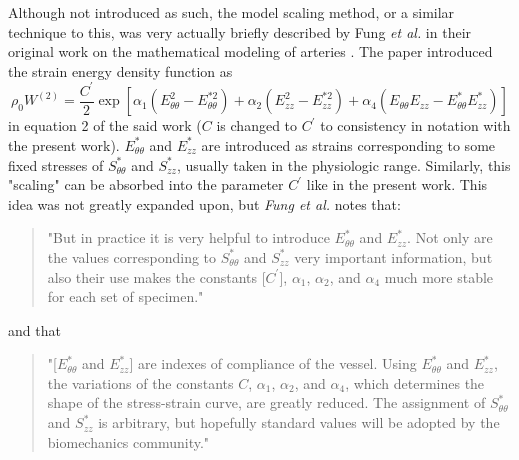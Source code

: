     Although not introduced as such, the model scaling method, or a similar technique to this, was very actually briefly described by Fung \textit{et al.} in their original work on the mathematical modeling of arteries \cite{fung_pseudoelasticity_1979}. The paper introduced the strain energy density function as 
\begin{equation}\label{eqn:fungarterymodel}
\rho_0 W^{(2)} = \frac{C^\prime}{2}\operatorname{exp}\left[\alpha_1 \left(E_{\theta\theta}^2 - E_{\theta\theta}^{*2} \right) + \alpha_2 \left(E_{zz}^2 - E_{zz}^{*2} \right) + \alpha_4 \left(E_{\theta\theta}E_{zz} - E_{\theta\theta}^*E_{zz}^* \right) \right]
\end{equation}
in equation 2 of the said work ($C$ is changed to $C^\prime$ to consistency in notation with the present work). $E_{\theta\theta}^*$ and $E_{zz}^*$ are introduced as strains corresponding to some fixed stresses of $S_{\theta\theta}^*$ and $S_{zz}^*$, usually taken in the physiologic range. Similarly, this "scaling" can be absorbed into the parameter $C^\prime$ like in the present work. This idea was not greatly expanded upon, but \textit{Fung et al.} notes that:
\begin{quotation}
"But in practice it is very helpful to introduce $E_{\theta\theta}^*$ and $E_{zz}^*$. Not only are the values corresponding to $S_{\theta\theta}^*$ and $S_{zz}^*$ very important information, but also their use makes the constants [$C^\prime$], $\alpha_1$, $\alpha_2$, and $\alpha_4$ much more stable for each set of specimen." \cite{fung_pseudoelasticity_1979}
\end{quotation} 
and that 
\begin{quotation}
"[$E_{\theta\theta}^*$ and $E_{zz}^*$] are indexes of compliance of the vessel. Using $E_{\theta\theta}^*$ and $E_{zz}^*$, the variations of the constants $C$, $\alpha_1$, $\alpha_2$, and $\alpha_4$, which determines the shape of the stress-strain curve, are greatly reduced. The assignment of $S_{\theta\theta}^*$ and $S_{zz}^*$ is arbitrary, but hopefully standard values will be adopted by the biomechanics community." \cite{fung_pseudoelasticity_1979}
\end{quotation}

